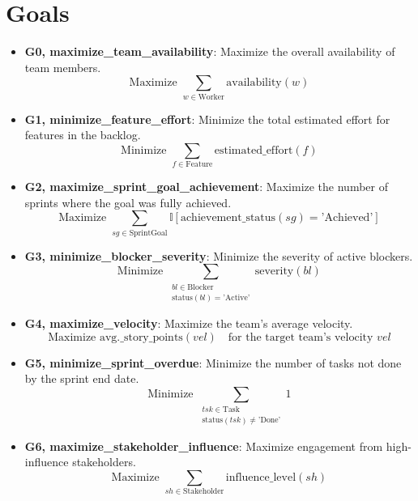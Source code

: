 \documentclass[11pt]{article}
\begin{document}
\section{Goals}
\begin{itemize}
    \item \textbf{G0, maximize\_team\_availability}: Maximize the overall availability of team members.
        \[ \text{Maximize } \sum_{w \in \text{Worker}} \text{availability}(w) \]
    \item \textbf{G1, minimize\_feature\_effort}: Minimize the total estimated effort for features in the backlog.
        \[ \text{Minimize } \sum_{f \in \text{Feature}} \text{estimated\_effort}(f) \]
    \item \textbf{G2, maximize\_sprint\_goal\_achievement}: Maximize the number of sprints where the goal was fully achieved.
        \[ \text{Maximize } \sum_{sg \in \text{SprintGoal}} \mathbb{I}[\text{achievement\_status}(sg) = \text{'Achieved'}] \]
    \item \textbf{G3, minimize\_blocker\_severity}: Minimize the severity of active blockers.
        \[ \text{Minimize } \sum_{\substack{bl \in \text{Blocker} \\ \text{status}(bl) = \text{'Active'}}} \text{severity}(bl) \]
    \item \textbf{G4, maximize\_velocity}: Maximize the team's average velocity.
        \[ \text{Maximize } \text{avg.\_story\_points}(vel) \quad \text{for the target team's velocity } vel \]
    \item \textbf{G5, minimize\_sprint\_overdue}: Minimize the number of tasks not done by the sprint end date.
        \[ \text{Minimize } \sum_{\substack{tsk \in \text{Task} \\ \text{status}(tsk) \neq \text{'Done'}}} 1 \]
    \item \textbf{G6, maximize\_stakeholder\_influence}: Maximize engagement from high-influence stakeholders.
        \[ \text{Maximize } \sum_{sh \in \text{Stakeholder}} \text{influence\_level}(sh) \]
\end{itemize}
\end{document}
